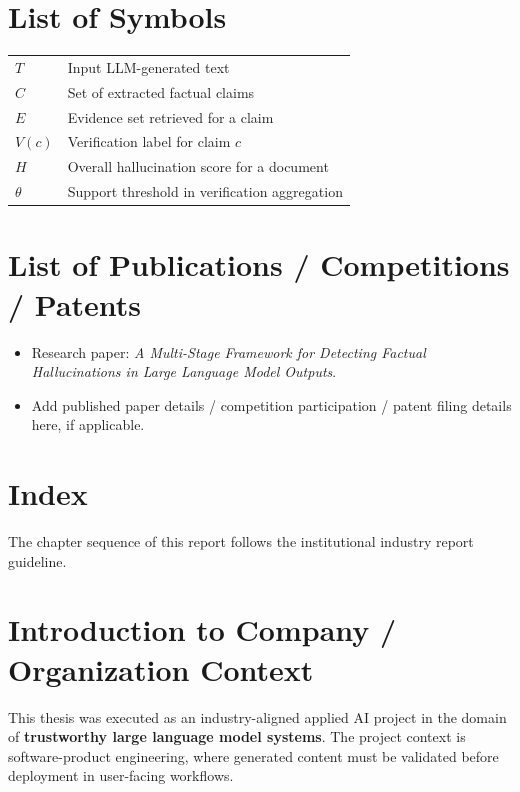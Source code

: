 \documentclass[12pt,a4paper]{report}
\begin{document}
\tableofcontents
\listoffigures
\listoftables

\chapter*{List of Symbols}
\begin{longtable}{p{} p{}}
$T$ & Input LLM-generated text \\
$C$ & Set of extracted factual claims \\
$E$ & Evidence set retrieved for a claim \\
$V(c)$ & Verification label for claim $c$ \\
$H$ & Overall hallucination score for a document \\
$\theta$ & Support threshold in verification aggregation \\
\end{longtable}

\chapter*{List of Publications / Competitions / Patents}
\begin{itemize}[leftmargin=1.5em]
\item Research paper: \textit{A Multi-Stage Framework for Detecting Factual Hallucinations in Large Language Model Outputs}.
\item Add published paper details / competition participation / patent filing details here, if applicable.
\end{itemize}

\clearpage
{}

\chapter*{Index}
The chapter sequence of this report follows the institutional industry report guideline.

\chapter{Introduction to Company / Organization Context}
This thesis was executed as an industry-aligned applied AI project in the domain of
\textbf{trustworthy large language model systems}. The project context is software-product
engineering, where generated content must be validated before deployment in user-facing workflows.
\end{document}
